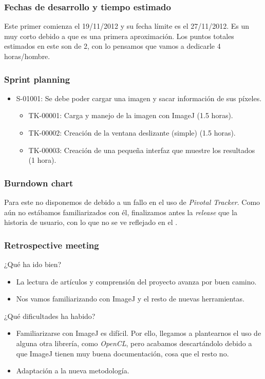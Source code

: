 \subsubsection*{Fechas de desarrollo y tiempo estimado}
Este primer \sprint{} comienza el 19/11/2012 y su fecha límite es el 27/11/2012. Es un \sprint{} muy corto debido a que es una primera aproximación. Los puntos totales estimados en este \sprint{} son de 2, con lo pensamos que vamos a dedicarle 4 horas/hombre.

\subsubsection*{Sprint planning}
\begin{itemize}
\item  S-01001: Se debe poder cargar una imagen y sacar información de sus píxeles.
	\begin{itemize}
	\item TK-00001: Carga y manejo de la imagen con ImageJ (1.5 horas).
	\item TK-00002: Creación de la ventana deslizante (simple) (1.5 horas).
	\item TK-00003: Creación de una pequeña interfaz que muestre los resultados (1 hora).
	\end{itemize}
\end{itemize}

\subsubsection*{Burndown chart}
Para este \sprint{} no disponemos de \burndownchart{} debido a un fallo en el uso de \textit{Pivotal Tracker}. Como aún no estábamos familiarizados con él, finalizamos antes la \textit{release} que la historia de usuario, con lo que no se ve reflejado en el \burndownchart{}.

\subsubsection*{Retrospective meeting}
¿Qué ha ido bien?
\begin{itemize}
 \item La lectura de artículos y comprensión del proyecto avanza por buen camino.
 \item Nos vamos familiarizando con ImageJ y el resto de nuevas herramientas.
\end{itemize}

¿Qué dificultades ha habido?
\begin{itemize}
 \item Familiarizarse con ImageJ es difícil. Por ello, llegamos a plantearnos el uso de alguna otra librería, como \textit{OpenCL}, pero acabamos descartándolo debido a que ImageJ tienen muy buena documentación, cosa que el resto no.
 \item Adaptación a la nueva metodología.
\end{itemize}


